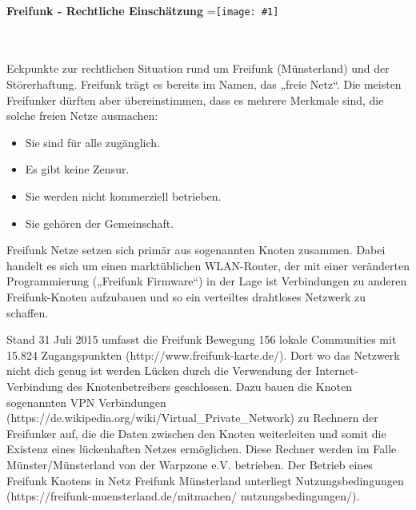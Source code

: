 \documentclass{article}
\begin{document}
\pagestyle{fancy}
\renewcommand{\headrulewidth}{0pt}
\fancyhf{
\fancyhead[LE,RO]{\color[rgb]{0.8627,0,0.4039}\noindent\makebox[\linewidth]{\rule{\paperwidth}{36pt}}}
\fancyfoot[LE,RO]{\color[rgb]{0.8627,0,0.4039}\noindent\makebox[\linewidth]{\rule{\paperwidth}{36pt}}}}
\newcommand{\vcenteredinclude}[1]{\begingroup
\setbox0=\hbox{\texttt{[image: \#1]}}%
\parbox{\wd0}{\box0}\endgroup}
\vspace{0.5cm}\ \\
	\textbf{\Huge
	Freifunk - Rechtliche Einschätzung} \hfill\vcenteredinclude{Vorlagen/logo-gt.png}\\
\vspace{0.5cm}\ \\

Eckpunkte zur rechtlichen Situation rund um Freifunk (Münsterland) und der Störerhaftung. Freifunk trägt es bereits im Namen, das „freie Netz“. Die meisten Freifunker dürften aber übereinstimmen, dass es mehrere Merkmale sind, die solche freien Netze ausmachen:
\begin{itemize}
	\item Sie sind für alle zugänglich.
	\item Es gibt keine Zensur.
	\item Sie werden nicht kommerziell betrieben.
	\item Sie gehören der Gemeinschaft.
\end{itemize}

Freifunk Netze setzen sich primär aus sogenannten Knoten zusammen. Dabei handelt es sich um einen marktüblichen WLAN-Router, der mit einer veränderten Programmierung („Freifunk Firmware“) in der Lage ist Verbindungen zu anderen Freifunk-Knoten aufzubauen und so ein verteiltes drahtloses Netzwerk zu schaffen.

Stand 31 Juli 2015 umfasst die Freifunk Bewegung 156 lokale Communities mit 15.824 Zugangspunkten (http://www.freifunk-karte.de/). Dort wo das Netzwerk nicht dich genug ist werden Lücken durch die Verwendung der Internet-Verbindung des Knotenbetreibers geschlossen. Dazu bauen die Knoten sogenannten VPN Verbindungen (https://de.wikipedia.org/wiki/Virtual\_Private\_Network) zu Rechnern der Freifunker auf, die die Daten zwischen den Knoten weiterleiten und somit die Existenz eines lückenhaften Netzes ermöglichen. Diese Rechner werden im Falle Münster/Münsterland von der Warpzone e.V. betrieben.  Der Betrieb eines Freifunk Knotens in Netz Freifunk Münsterland unterliegt Nutzungsbedingungen (https://freifunk-muensterland.de/mitmachen/ nutzungsbedingungen/).
\end{document}
